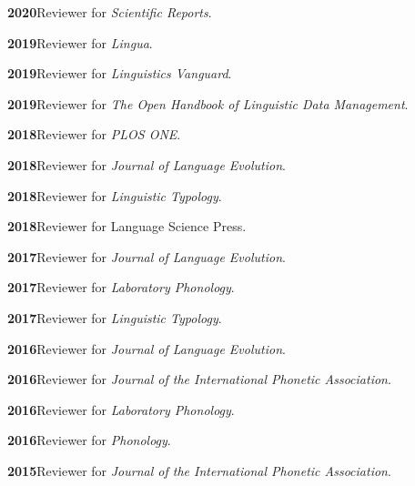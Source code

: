 \documentclass[11pt]{article}
\newcommand{\hangpara}{
 \setlength{\parindent}{0in} %
 \hangindent=0.42in %
}
\begin{document}
\vskip 6pt
\hangpara
{\bf 2020}\hspace{1ex}Reviewer for \textit{Scientific Reports}.

\vskip 6pt
\hangpara
{\bf 2019}\hspace{1ex}Reviewer for \textit{Lingua}.

\vskip 6pt
\hangpara
{\bf 2019}\hspace{1ex}Reviewer for \textit{Linguistics Vanguard}.

\vskip 6pt
\hangpara
{\bf 2019}\hspace{1ex}Reviewer for \textit{The Open Handbook of Linguistic Data Management}.

\vskip 6pt
\hangpara
{\bf 2018}\hspace{1ex}Reviewer for \textit{PLOS ONE}.

\vskip 6pt
\hangpara
{\bf 2018}\hspace{1ex}Reviewer for \textit{Journal of Language Evolution}.

\vskip 6pt
\hangpara
{\bf 2018}\hspace{1ex}Reviewer for \textit{Linguistic Typology}.

\vskip 6pt
\hangpara
{\bf 2018}\hspace{1ex}Reviewer for Language Science Press.

\vskip 6pt
\hangpara
{\bf 2017}\hspace{1ex}Reviewer for \textit{Journal of Language Evolution}.

\vskip 6pt
\hangpara
{\bf 2017}\hspace{1ex}Reviewer for \textit{Laboratory Phonology}.

\vskip 6pt
\hangpara
{\bf 2017}\hspace{1ex}Reviewer for \textit{Linguistic Typology}.

\vskip 6pt
\hangpara
{\bf 2016}\hspace{1ex}Reviewer for \textit{Journal of Language Evolution}.

\vskip 6pt
\hangpara
{\bf 2016}\hspace{1ex}Reviewer for \textit{Journal of the International Phonetic Association}.

\vskip 6pt
\hangpara
{\bf 2016}\hspace{1ex}Reviewer for \textit{Laboratory Phonology}.

\vskip 6pt
\hangpara
{\bf 2016}\hspace{1ex}Reviewer for \textit{Phonology}.

\vskip 6pt
\hangpara
{\bf 2015}\hspace{1ex}Reviewer for \textit{Journal of the International Phonetic Association}.
\end{document}
